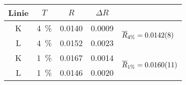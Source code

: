\begin{tabular}{cSSSl}
\toprule
Linie & {$T$}   & {$R$}      & ${\Delta R}$     & \\
\midrule
K     & \SI{4}{\percent} & 0.0140 & 0.0009 &  \\
L     & \SI{4}{\percent} & 0.0152 & 0.0023 &                    \\
K     & \SI{1}{\percent} & 0.0167 & 0.0014 &  \\
L     & \SI{1}{\percent} & 0.0146 & 0.0020 &                    \\
\bottomrule
\end{tabular}